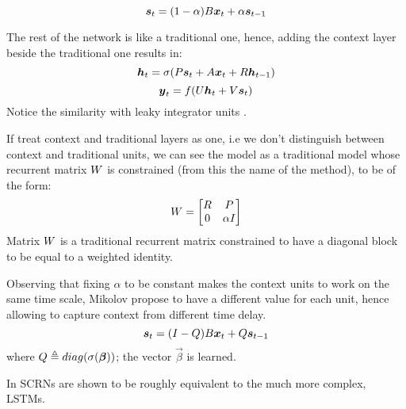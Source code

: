 \begin{equation}
 \boldsymbol{s}_t = (1-\alpha)B\boldsymbol{x}_t + \alpha\boldsymbol{s}_{t-1}
\end{equation}

The rest of the network is like a traditional one, hence, adding the context layer beside the traditional one results 
in:
\begin{equation}
 \boldsymbol{h}_t = \sigma(P\boldsymbol{s}_t + A\boldsymbol{x}_t + R\boldsymbol{h}_{t-1})
\end{equation}
\begin{equation}
 \boldsymbol{y}_t = f(U\boldsymbol{h}_t + V\boldsymbol{s}_t)
\end{equation}
Notice the similarity with leaky integrator units \cite{leakyIntegratorUnits}.

If treat context and traditional layers as one, i.e we don't distinguish between context and traditional units, we can 
see the model as a traditional model whose recurrent matrix $W$ is constrained (from this the name of the 
method), to be of the form:
\begin{equation}
 W =  \begin{bmatrix}
R & P \\
0 & \alpha I
\end{bmatrix}
\end{equation}
Matrix $W$ is a traditional recurrent matrix constrained to have a diagonal block to be equal to a weighted 
identity. 

Observing that fixing $\alpha$ to be constant makes the context units to work on the same time scale, Mikolov propose 
to have a different value for each unit, hence allowing to capture context from different time delay.
\begin{equation}
  \boldsymbol{s}_t = (I-Q)B\boldsymbol{x}_t + Q\boldsymbol{s}_{t-1}
\end{equation}
where $Q\triangleq diag(\sigma(\boldsymbol{\beta}))$; the vector $\vec{\beta}$ is learned.


In \cite{scrn} SCRNs are shown to be roughly equivalent to the much more complex, LSTMs.


